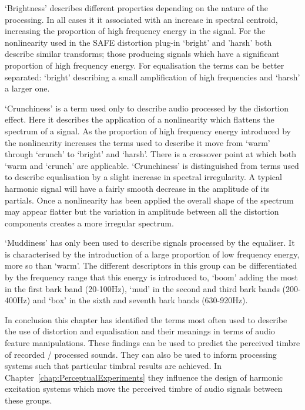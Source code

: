 	`Brightness' describes different properties depending on the nature of the processing. In all cases it it
	associated with an increase in spectral centroid, increasing the proportion of high frequency energy in the signal.
	For the nonlinearity used in the SAFE distortion plug-in `bright' and 'harsh' both describe similar transforms;
	those producing signals which have a significant proportion of high frequency energy. For equalisation the terms
	can be better separated: `bright' describing a small amplification of high frequencies and `harsh' a larger one.

	`Crunchiness' is a term used only to describe audio processed by the distortion effect. Here it describes the
	application of a nonlinearity which flattens the spectrum of a signal. As the proportion of high frequency energy
	introduced by the nonlinearity increases the terms used to describe it move from `warm' through `crunch' to
	`bright' and `harsh'. There is a crossover point at which both `warm and `crunch' are applicable. `Crunchiness' is
	distinguished from terms used to describe equalisation by a slight increase in spectral irregularity. A typical
	harmonic signal will have a fairly smooth decrease in the amplitude of its partials. Once a nonlinearity has been
	applied the overall shape of the spectrum may appear flatter but the variation in amplitude between all the
	distortion components creates a more irregular spectrum.

	`Muddiness' has only been used to describe signals processed by the equaliser. It is characterised by the
	introduction of a large proportion of low frequency energy, more so than `warm'. The different descriptors in this
	group can be differentiated by the frequency range that this energy is introduced to, `boom' adding the most in the
	first bark band (20-100Hz), `mud' in the second and third bark bands (200-400Hz) and `box' in the sixth and seventh
	bark bands (630-920Hz).

	In conclusion this chapter has identified the terms most often used to describe the use of distortion and
	equalisation and their meanings in terms of audio feature manipulations. These findings can be used to predict the
	perceived timbre of recorded / processed sounds. They can also be used to inform processing systems such that
	particular timbral results are achieved. In Chapter~\ref{chap:PerceptualExperiments} they influence the design of
	harmonic excitation systems which move the perceived timbre of audio signals between these groups.
